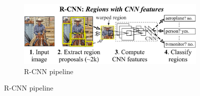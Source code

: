 \documentclass[12pt, a4paper]{article}
\begin{document}
\begin{figure}[h]
\begin{minipage}[t]{0.55\textwidth}
    \begin{figure}[H]
        \centering
        \includegraphics[width=\linewidth]{pictures/rcc_pipe.pdf}
        \caption{R-CNN pipeline}
        \label{fig:rcc_pipe}
    \end{figure}
    

\end{minipage}
\end{figure}
\end{document}
